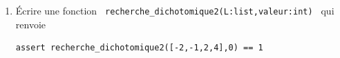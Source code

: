 \documentclass[a4paper,12pt,openany]{book}
\begin{document}
\begin{enumerate}
\begin{lstlisting}[numbers = none]
assert recherche_zero(-3,3,f) == 5
\end{lstlisting}

\medskip


\item Écrire une fonction \verb+ recherche_dichotomique2(L:list,valeur:int) + qui renvoie 


\begin{lstlisting}[numbers = none]
assert recherche_dichotomique2([-2,-1,2,4],0) == 1
\end{lstlisting}


\medskip


\end{enumerate}
\end{document}

